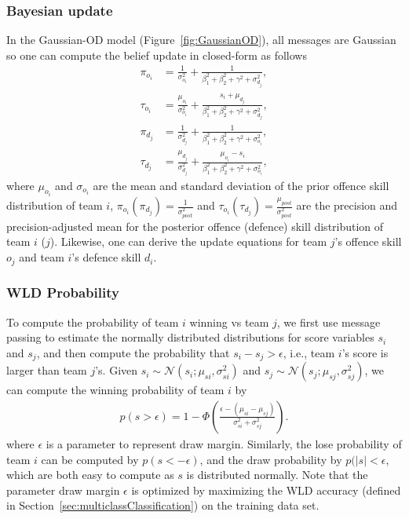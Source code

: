 \subsubsection{Bayesian update} 
In the Gaussian-OD model (Figure~\ref{fig:GaussianOD}), all
messages are Gaussian so one can
compute the belief update in closed-form as follows
\begin{align}
\label{eq:GaussianGraphicalModelsUpdatingEquation}
  \pi_{o_{i}}     &=    \frac{1}{\sigma_{o_{i}}^2} + \frac{1}{\beta_1^2+\beta_2^2+\gamma^2+\sigma_{d_{j}}^2},  \nonumber \\
  \tau_{o_{i}}    &=    \frac{\mu_{o_{i}}}{\sigma_{o_{i}}^2} + \frac{s_i+\mu_{d_{j}}}{\beta_1^2+\beta_2^2+\gamma^2+\sigma_{d_{j}}^2},  \nonumber \\
  \pi_{d_{j}}     &=    \frac{1}{\sigma_{d_{j}}^2} + \frac{1}{\beta_1^2+\beta_2^2+\gamma^2+\sigma_{o_{i}}^2}, \nonumber \\
  \tau_{d_{j}}    &=    \frac{\mu_{d_{j}}}{\sigma_{d_{j}}^2} + \frac{\mu_{o_{i}}-s_i}{\beta_1^2+\beta_2^2+\gamma^2+\sigma_{o_{i}}^2},
\end{align}
\unindentmore where $\mu_{o_{i}}$ and $\sigma_{o_{i}}$ are the mean
and standard deviation of the prior offence skill distribution of team
$i$, $\pi_{o_{i}} (\pi_{d_{j}}) = \frac{1}{\sigma_{\mathit{post}}^2}$
and $\tau_{o_{i}} (\tau_{d_{j}}) =
\frac{\mu_{\mathit{post}}}{\sigma_{\mathit{post}}^2}$ are the
precision and precision-adjusted mean for the posterior offence
(defence) skill distribution of team $i$ ($j$).  Likewise, one can
derive the update equations for team $j$'s offence skill $o_j$ and
team $i$'s defence skill $d_i$.

\subsubsection{WLD Probability} 
To compute the probability of team $i$ winning vs team $j$, we first use message
passing to estimate the normally distributed distributions for score
variables $s_i$ and $s_j$, and then compute the probability that
$s_i-s_j>\epsilon$, i.e., team $i$'s score is larger than team $j$'s. Given
$s_i\sim\mathcal{N}(s_i;\mu_{si},\sigma_{si}^2)$ and
$s_j\sim\mathcal{N}(s_j;\mu_{sj},\sigma_{sj}^2)$, we can compute the
winning probability of team $i$ by
\begin{align}
  p(s>\epsilon) = 1 - \Phi\left(\frac{\epsilon-(\mu_{si}-\mu_{sj})}{\sigma_{si}^2+\sigma_{sj}^2}\right).
\end{align}
where $\epsilon$ is a parameter to represent draw margin. Similarly, the lose probability of team $i$ can be computed by $p(s<-\epsilon)$, and the draw probability by $p(|s|<\epsilon$, which are both easy to compute as $s$ is distributed normally. Note that the parameter draw margin $\epsilon$ is optimized by maximizing the WLD accuracy (defined in Section~\ref{sec:multiclassClassification}) on the training data set.

